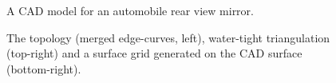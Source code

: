 {
\begin{figure}[hbt]
\newcommand{\figWidtha}{8cm}
\newcommand{\trimfig}[2]{\trimFig{#1}{#2}{0}{.0}{.1}{.1}}
\begin{center}
\end{center}
\caption{A CAD model for an automobile rear view mirror.}
\label{fig:retroCAD}
\end{figure}
}
{
\begin{figure}[hbt]
\newcommand{\figWidtha}{8cm}
\newcommand{\trimfig}[2]{\trimFigb{#1}{#2}{0}{.0}{.1}{.1}}
\begin{center}
\end{center}
\caption{The topology (merged edge-curves, left), water-tight triangulation (top-right)  and a surface grid generated
  on the CAD surface (bottom-right).}
\label{fig:retroTopo}
\end{figure}
}

